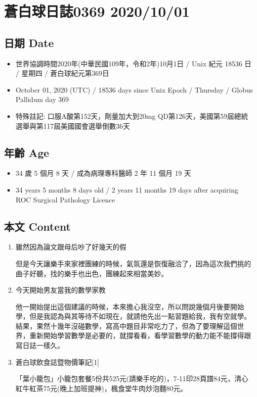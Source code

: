\documentclass[
]{article}
\author{}
\date{}
\providecommand{\tightlist}{%
  \setlength{\itemsep}{0pt}\setlength{\parskip}{0pt}}
\begin{document}
\hypertarget{ux84bcux767dux7403ux65e5ux8a8c0369-20201001}{%
\section{蒼白球日誌0369
2020/10/01}\label{ux84bcux767dux7403ux65e5ux8a8c0369-20201001}}

\hypertarget{ux65e5ux671f-date}{%
\subsection{日期 Date}\label{ux65e5ux671f-date}}

\begin{itemize}
\tightlist
\item
  世界協調時間2020年(中華民國109年，令和2年)10月1日 / Unix 紀元 18536 日
  / 星期四 / 蒼白球紀元第369日
\item
  October 01, 2020 (UTC) / 18536 days since Unix Epoch / Thursday /
  Globus Pallidum day 369
\item
  特殊註記: 口服A酸第152天，劑量加大到20mg
  QD第126天，美國第59屆總統選舉與第117屆美國國會選舉倒數36天
\end{itemize}

\hypertarget{ux5e74ux9f61-age}{%
\subsection{年齡 Age}\label{ux5e74ux9f61-age}}

\begin{itemize}
\tightlist
\item
  34 歲 5 個月 8 天 / 成為病理專科醫師 2 年 11 個月 19 天
\item
  34 years 5 months 8 days old / 2 years 11 months 19 days after
  acquiring ROC Surgical Pathology Licence
\end{itemize}

\hypertarget{ux672cux6587-content}{%
\subsection{本文 Content}\label{ux672cux6587-content}}

\begin{enumerate}
\def\labelenumi{\arabic{enumi}.}
\item
  雖然因為論文跟母后吵了好幾天的假

  但是今天讓樂手來家裡團練的時候，氣氛還是恢復融洽了，因為這次我們挑的曲子好聽，找的樂手也出色，團練起來相當美妙。
\item
  今天開始男友當我的數學家教

  他一開始提出這個建議的時候，本來擔心我沒空，所以問說幾個月後要開始學，但是我認為與其等待不如現在，就請他先出一點習題給我，我有空就學。結果，果然十幾年沒碰數學，寫高中題目非常吃力了，但為了要理解這個世界，重新開始學習數學是必要的，就撐看看，看學習數學的動力能不能撐得跟寫日誌一樣久。
\item
  蒼白球飲食誌暨物價筆記{[}1{]}

  「葉小籠包」小籠包套餐5份共525元(請樂手吃的)，7-11印28頁譜84元，清心紅牛紅茶75元(晚上加班提神)，楓食堂牛肉炒泡麵80元。
\end{enumerate}
\end{document}
